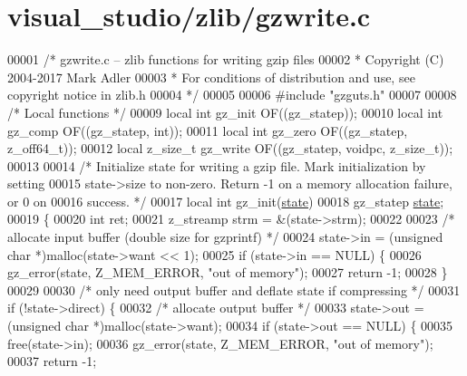 \hypertarget{visual__studio_2zlib_2gzwrite_8c_source}{}\section{visual\+\_\+studio/zlib/gzwrite.c}
\label{visual__studio_2zlib_2gzwrite_8c_source}

\begin{DoxyCode}
00001 \textcolor{comment}{/* gzwrite.c -- zlib functions for writing gzip files}
00002 \textcolor{comment}{ * Copyright (C) 2004-2017 Mark Adler}
00003 \textcolor{comment}{ * For conditions of distribution and use, see copyright notice in zlib.h}
00004 \textcolor{comment}{ */}
00005 
00006 \textcolor{preprocessor}{#include "gzguts.h"}
00007 
00008 \textcolor{comment}{/* Local functions */}
00009 local \textcolor{keywordtype}{int} gz\_init OF((gz\_statep));
00010 local \textcolor{keywordtype}{int} gz\_comp OF((gz\_statep, \textcolor{keywordtype}{int}));
00011 local \textcolor{keywordtype}{int} gz\_zero OF((gz\_statep, z\_off64\_t));
00012 local z\_size\_t gz\_write OF((gz\_statep, voidpc, z\_size\_t));
00013 
00014 \textcolor{comment}{/* Initialize state for writing a gzip file.  Mark initialization by setting}
00015 \textcolor{comment}{   state->size to non-zero.  Return -1 on a memory allocation failure, or 0 on}
00016 \textcolor{comment}{   success. */}
00017 local \textcolor{keywordtype}{int} gz\_init(\hyperlink{structstate}{state})
00018     gz\_statep \hyperlink{structstate}{state};
00019 \{
00020     \textcolor{keywordtype}{int} ret;
00021     z\_streamp strm = &(state->strm);
00022 
00023     \textcolor{comment}{/* allocate input buffer (double size for gzprintf) */}
00024     state->in = (\textcolor{keywordtype}{unsigned} \textcolor{keywordtype}{char} *)malloc(state->want << 1);
00025     \textcolor{keywordflow}{if} (state->in == NULL) \{
00026         gz\_error(state, Z\_MEM\_ERROR, \textcolor{stringliteral}{"out of memory"});
00027         \textcolor{keywordflow}{return} -1;
00028     \}
00029 
00030     \textcolor{comment}{/* only need output buffer and deflate state if compressing */}
00031     \textcolor{keywordflow}{if} (!state->direct) \{
00032         \textcolor{comment}{/* allocate output buffer */}
00033         state->out = (\textcolor{keywordtype}{unsigned} \textcolor{keywordtype}{char} *)malloc(state->want);
00034         \textcolor{keywordflow}{if} (state->out == NULL) \{
00035             free(state->in);
00036             gz\_error(state, Z\_MEM\_ERROR, \textcolor{stringliteral}{"out of memory"});
00037             \textcolor{keywordflow}{return} -1;

\end{DoxyCode}
